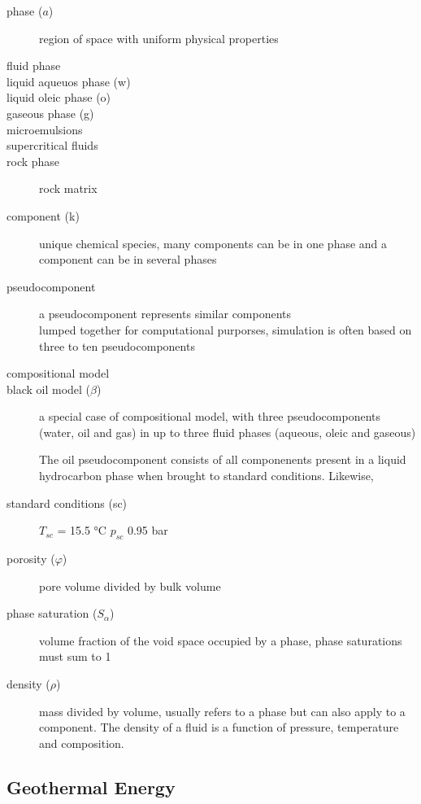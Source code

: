 \documentclass{article} %
\begin{document}
\begin{description}
  \item[phase ($a$)] region of space with uniform physical properties
  \item[fluid phase]
  \item[liquid aqueuos phase (w)]
  \item[liquid oleic phase (o)]
  \item[gaseous phase (g)]
  \item[microemulsions]
  \item[supercritical fluids]
  \item[rock phase] rock matrix
  \item[component (k)] unique chemical species, many components can be in one phase and a component can be in several phases
  \item[pseudocomponent] a pseudocomponent represents similar components \\ lumped together for computational purporses, simulation is often based on three to ten pseudocomponents
  \item[compositional model]
  \item[black oil model ($\beta$)] a special case of compositional model, with three pseudocomponents (water, oil and gas) in up to three fluid phases (aqueous, oleic and gaseous)

    The oil pseudocomponent consists of all componenents present in a liquid hydrocarbon phase when brought to standard conditions. Likewise,
  \item[standard conditions (sc)] $T_{sc}$ = 15.5 °C  $p_{sc}$ 0.95 bar
  \item[porosity ($\varphi$)] pore volume divided by bulk volume
  \item[phase saturation ($S_{\alpha}$)] volume fraction of the void space occupied by a phase, phase saturations must sum to 1
  \item[density ($\rho$)] mass divided by volume, usually refers to a phase but can also apply to a component. The density of a fluid is a function of pressure, temperature and composition.
\end{description}



%
%


\subsection{Geothermal Energy}


\printbibliography
\end{document}
